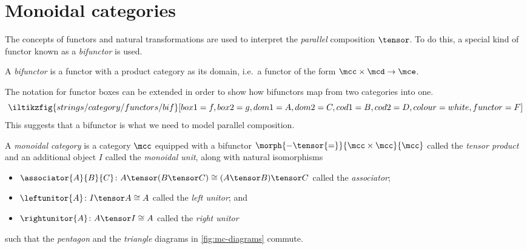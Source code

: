 \section{Monoidal categories}\label{sec:monoidal-categories}

The concepts of functors and natural transformations are used to interpret
the \emph{parallel} composition \(\tensor\).
To do this, a special kind of functor known as a \emph{bifunctor} is used.

\begin{definition}[Bifunctor]
    A \emph{bifunctor} is a functor with a product category as its domain, i.e.\
    a functor of the form \(\mcc \times \mcd \to \mce\).
\end{definition}

The notation for functor boxes can be extended in order to show how bifunctors
map from two categories into one.
\[
    \iltikzfig{strings/category/functors/bif}[box1=f,box2=g,dom1=A,dom2=C,cod1=B,cod2=D,colour=white,functor=F]
\]
This suggests that a bifunctor is what we need to model
parallel composition.

\begin{definition}
    \nomenclature{\(\tensor\)}
    \label{def:monoidal-category}
    A \emph{monoidal category} is a category \(\mcc\) equipped with a
    bifunctor \(\morph{{-} \tensor {=}}{\mcc \times \mcc}{\mcc}\) called the
    \emph{tensor product} and an additional object \(I\) called the
    \emph{monoidal unit},
    along with natural isomorphisms
    \begin{itemize}
        \item \(
              \associator{A}{B}{C}
              \colon
              A \tensor (B \tensor C)
              \cong
              (A \tensor B) \tensor C
              \) called the \emph{associator};
        \item \(
              \leftunitor{A}
              \colon
              I \tensor A
              \cong
              A
              \) called the \emph{left unitor}; and
        \item \(
              \rightunitor{A}
              \colon
              A \tensor I
              \cong
              A
              \) called the \emph{right unitor}
    \end{itemize}
    such that the \emph{pentagon} and the \emph{triangle} diagrams in
    \cref{fig:mc-diagrams} commute.
\end{definition}

